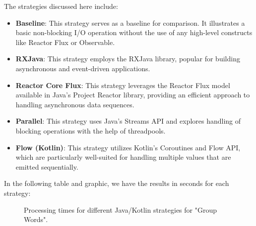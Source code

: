    The strategies discussed here include:

    \begin{itemize}
        \item \textbf{Baseline}: This strategy serves as a baseline for comparison. It illustrates a basic non-blocking I/O operation without the use of any high-level constructs like Reactor Flux or Observable.
        \item \textbf{RXJava}: This strategy employs the RXJava library, popular for building asynchronous and event-driven applications.
        \item \textbf{Reactor Core Flux}: This strategy leverages the Reactor Flux model available in Java's Project Reactor library, providing an efficient approach to handling asynchronous data sequences.
        \item \textbf{Parallel}: This strategy uses Java's Streams API and explores handling of blocking operations with the help of threadpools.
        \item \textbf{Flow (Kotlin)}: This strategy utilizes Kotlin's Coroutines and Flow API, which are particularly well-suited for handling multiple values that are emitted sequentially.
    \end{itemize}

    In the following table and graphic, we have the results in seconds for each strategy:

    \begin{figure}[H]
        \centering
        \caption{Processing times for different Java/Kotlin strategies for "Group Words".}
        \label{fig:processing_times}
    \end{figure}
    

